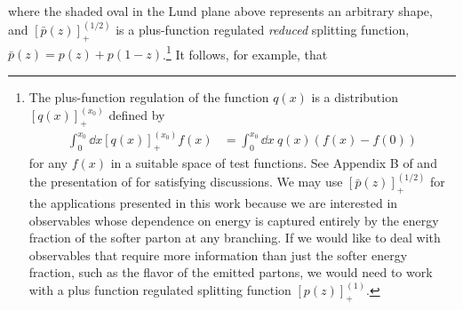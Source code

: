 where the shaded oval in the Lund plane above represents an arbitrary shape, and \([\bar{p}(z)]^{(1/2)}_+\) is a plus-function regulated \textit{reduced} splitting function, \(\bar{p}(z) = p(z) + p(1-z)\).\footnote{
The plus-function regulation of the function \(q(x)\) is a distribution \([q(x)]^{(x_0)}_+\) defined by
\begin{align}
    \int_0^{x_0} \dd x [q(x)]^{(x_0)}_+ f(x)
    &=
    \int_0^{x_0} \dd x ~ q(x) \left(f(x)  - f(0)\right)
\end{align}
%
for any \(f(x)\) in a suitable space of test functions.
%
See Appendix B of  and the presentation of  for satisfying discussions.
%
We may use \([\bar{p}(z)]^{(1/2)}_+\) for the applications presented in this work because we are interested in observables whose dependence on energy is captured entirely by the energy fraction of the softer parton at any branching.
%
If we would like to deal with observables that require more information than just the softer energy fraction, such as the flavor of the emitted partons, we would need to work with a plus function regulated splitting function \([p(z)]^{(1)}_+\).
}
%
It follows, for example, that
%

